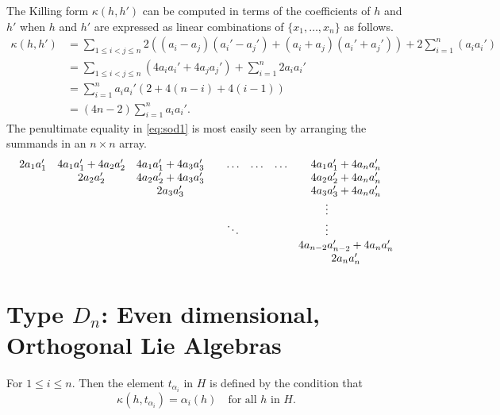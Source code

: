 The Killing form $\kappa(h,h')$ can be computed in terms of the coefficients
of $h$ and $h'$ when $h$ and $h'$ are expressed as linear combinations of
$\{x_1, \dots, x_n\}$ as follows.
\begin{equation}
  \label{eq:sod1}
  \begin{aligned}
    \kappa(h,h')&= \sum_{1\leq i<j\leq n} 2\left( (a_i-a_j)(a_i'-a_j') +
      (a_i+a_j)(a_i'+a_j') \right) +2\sum_{i=1}^n \left( a_ia_i' \right)\\
    &= \sum_{1\leq i<j \leq n} (4a_ia_i' +4a_ja_j') +\sum_{i=1}^n 2a_ia_i'
    \\
    &= \sum_{i=1}^n a_ia_i' (2+4(n-i) +4(i-1))\\
    &=(4n-2) \sum_{i=1}^n a_ia_i'.
  \end{aligned}
\end{equation}
The penultimate equality in \cref{eq:sod1} is most easily seen by arranging
the summands in an $n\times n$ array.
\[
\begin{array}{cccrrrrc}
  2a_1a_1'&4a_1a_1'+ 4a_2a_2'&4a_1a_1'+
  4a_3a_3'&&\dots&\dots&\dots&4a_{1}a_{1}'+ 4a_na_n' \\  
  &2a_2a_2'&4a_2a_2'+4a_3a_3'&&&&&4a_{2}a_{2}'+ 4a_na_n' \\
  &&2a_3a_3'&&&&&4a_{3}a_{3}'+ 4a_na_n' \\
  &&&&&&&\vdots\hphantom{+4a_na_n'}\\
  &&&&\ddots&&&\vdots\hphantom{+4a_na_n'}\\
  &&&&&&&4a_{n-2}a_{n-2}'+ 4a_na_n' \\ 
  &&&&&&&2a_na_n'
\end{array}
\]


\section{Type \texorpdfstring{$D_n$}{Dn}: Even dimensional, Orthogonal Lie
  Algebras} 

For $1\leq i\leq n$. Then the element $t_{\alpha_i}$ in $H$ is defined by
the condition that
\[
\kappa(h, t_{\alpha_i}) = \alpha_i(h) \quad \text{for all $h$ in $H$.}
\]

